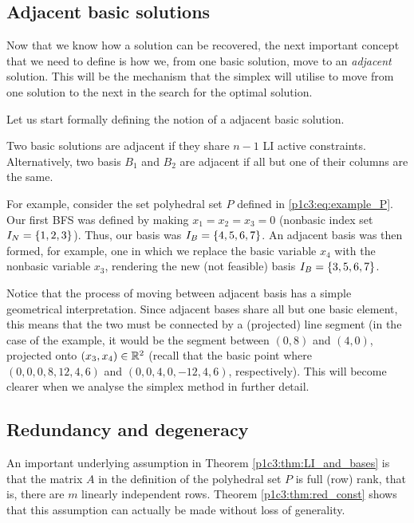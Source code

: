 \subsection{Adjacent basic solutions}

Now that we know how a solution can be recovered, the next important concept that we need to define is how we, from one basic solution, move to an \emph{adjacent} solution. This will be the mechanism that the simplex will utilise to move from one solution to the next in the search for the optimal solution.

Let us start formally defining the notion of a adjacent basic solution.
%
\begin{definition}
	Two basic solutions are adjacent if they share $n-1$ LI active constraints. Alternatively, two basis $B_1$ and $B_2$ are adjacent if all but one of their columns are the same.
\end{definition}
%
For example, consider the set polyhedral set $P$ defined in \eqref{p1c3:eq:example_P}. Our first BFS was defined by making $x_1 = x_2 = x_3 = 0$ (nonbasic index set $I_N = \left\{ 1,2,3 \right \}$). Thus, our basis was $I_B = \left\{ 4,5,6,7 \right \}$. An adjacent basis was then formed, for example, one in which we replace the basic variable $x_4$ with the nonbasic variable $x_3$, rendering the new (not feasible) basis $I_B = \left\{ 3,5,6,7 \right \}$.

Notice that the process of moving between adjacent basis has a simple geometrical interpretation. Since adjacent bases share all but one basic element, this means that the two must be connected by a (projected) line segment (in the case of the example, it would be the segment between $(0,8)$ and $(4,0)$, projected onto $(x_3,x_4) \in \mathbb{R}^2$ (recall that the basic point where $(0,0,0,8,12,4,6)$ and $(0,0,4,0,-12,4,6)$, respectively). This will become clearer when we analyse the simplex method in further detail. 



\subsection{Redundancy and degeneracy}

An important underlying assumption in Theorem \ref{p1c3:thm:LI_and_bases} is that the matrix $A$ in the definition of the polyhedral set $P$ is full (row) rank, that is, there are $m$ linearly independent rows. Theorem \ref{p1c3:thm:red_const} shows that this assumption can actually be made without loss of generality. 
 
